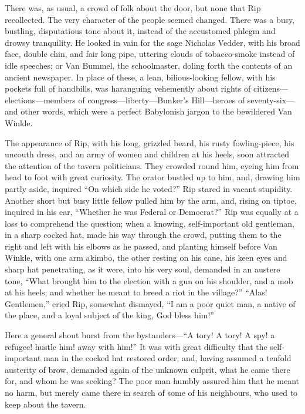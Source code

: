 There was, as usual, a crowd of folk about the door, but none that Rip recollected. The very character of the people seemed changed. There was a busy, bustling, disputatious tone about it, instead of the accustomed phlegm and drowsy tranquility. He looked in vain for the sage Nicholas Vedder, with his broad face, double chin, and fair long pipe, uttering clouds of tobacco-smoke instead of idle speeches; or Van Bummel, the schoolmaster, doling forth the contents of an ancient newspaper. In place of these, a lean, bilious-looking fellow, with his pockets full of handbills, was haranguing vehemently about rights of citizens—elections—members of congress—liberty—Bunker’s Hill—heroes of seventy-six—and other words, which were a perfect Babylonish jargon to the bewildered Van Winkle.

The appearance of Rip, with his long, grizzled beard, his rusty fowling-piece, his uncouth dress, and an army of women and children at his heels, soon attracted the attention of the tavern politicians. They crowded round him, eyeing him from head to foot with great curiosity. The orator bustled up to him, and, drawing him partly aside, inquired “On which side he voted?” Rip stared in vacant stupidity. Another short but busy little fellow pulled him by the arm, and, rising on tiptoe, inquired in his ear, “Whether he was Federal or Democrat?” Rip was equally at a loss to comprehend the question; when a knowing, self-important old gentleman, in a sharp cocked hat, made his way through the crowd, putting them to the right and left with his elbows as he passed, and planting himself before Van Winkle, with one arm akimbo, the other resting on his cane, his keen eyes and sharp hat penetrating, as it were, into his very soul, demanded in an austere tone, “What brought him to the election with a gun on his shoulder, and a mob at his heels; and whether he meant to breed a riot in the village?” “Alas! Gentlemen,” cried Rip, somewhat dismayed, “I am a poor quiet man, a native of the place, and a loyal subject of the king, God bless him!”



Here a general shout burst from the bystanders—“A tory! A tory! A spy! a refugee! hustle him! away with him!” It was with great difficulty that the self-important man in the cocked hat restored order; and, having assumed a tenfold austerity of brow, demanded again of the unknown culprit, what he came there for, and whom he was seeking? The poor man humbly assured him that he meant no harm, but merely came there in search of some of his neighbours, who used to keep about the tavern.

